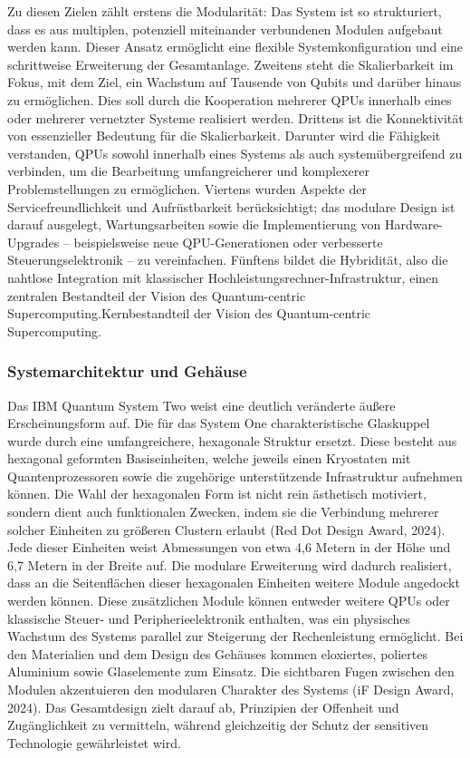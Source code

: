 Zu diesen Zielen zählt erstens die Modularität: Das System ist so strukturiert, dass es aus multiplen, potenziell miteinander verbundenen Modulen aufgebaut werden kann. Dieser Ansatz ermöglicht eine flexible Systemkonfiguration und eine schrittweise Erweiterung der Gesamtanlage. Zweitens steht die Skalierbarkeit im Fokus, mit dem Ziel, ein Wachstum auf Tausende von Qubits und darüber hinaus zu ermöglichen. Dies soll durch die Kooperation mehrerer QPUs innerhalb eines oder mehrerer vernetzter Systeme realisiert werden. Drittens ist die Konnektivität von essenzieller Bedeutung für die Skalierbarkeit. Darunter wird die Fähigkeit verstanden, QPUs sowohl innerhalb eines Systems als auch systemübergreifend zu verbinden, um die Bearbeitung umfangreicherer und komplexerer Problemstellungen zu ermöglichen. Viertens wurden Aspekte der Servicefreundlichkeit und Aufrüstbarkeit berücksichtigt; das modulare Design ist darauf ausgelegt, Wartungsarbeiten sowie die Implementierung von Hardware-Upgrades – beispielsweise neue QPU-Generationen oder verbesserte Steuerungselektronik – zu vereinfachen. Fünftens bildet die Hybridität, also die nahtlose Integration mit klassischer Hochleistungsrechner-Infrastruktur, einen zentralen Bestandteil der Vision des Quantum-centric Supercomputing.Kernbestandteil der Vision des Quantum-centric Supercomputing.

\subsubsection{Systemarchitektur und Gehäuse}
Das IBM Quantum System Two weist eine deutlich veränderte äußere Erscheinungsform auf. Die für das System One charakteristische Glaskuppel wurde durch eine umfangreichere, hexagonale Struktur ersetzt. Diese besteht aus hexagonal geformten Basiseinheiten, welche jeweils einen Kryostaten mit Quantenprozessoren sowie die zugehörige unterstützende Infrastruktur aufnehmen können. Die Wahl der hexagonalen Form ist nicht rein ästhetisch motiviert, sondern dient auch funktionalen Zwecken, indem sie die Verbindung mehrerer solcher Einheiten zu größeren Clustern erlaubt (Red Dot Design Award, 2024). Jede dieser Einheiten weist Abmessungen von etwa 4,6 Metern in der Höhe und 6,7 Metern in der Breite auf. Die modulare Erweiterung wird dadurch realisiert, dass an die Seitenflächen dieser hexagonalen Einheiten weitere Module angedockt werden können. Diese zusätzlichen Module können entweder weitere QPUs oder klassische Steuer- und Peripherieelektronik enthalten, was ein physisches Wachstum des Systems parallel zur Steigerung der Rechenleistung ermöglicht. Bei den Materialien und dem Design des Gehäuses kommen eloxiertes, poliertes Aluminium sowie Glaselemente zum Einsatz. Die sichtbaren Fugen zwischen den Modulen akzentuieren den modularen Charakter des Systems (iF Design Award, 2024). Das Gesamtdesign zielt darauf ab, Prinzipien der Offenheit und Zugänglichkeit zu vermitteln, während gleichzeitig der Schutz der sensitiven Technologie gewährleistet wird.


